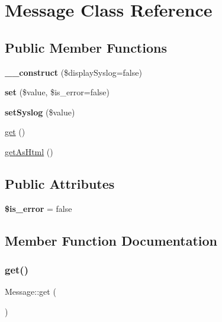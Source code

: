 \hypertarget{classMessage}{}\section{Message Class Reference}
\label{classMessage}
\subsection*{Public Member Functions}
\begin{DoxyCompactItemize}
\item 
\mbox{\label{classMessage_af63a9fa2f7f10cb76bd52a01ce8a8559}} 
{\bfseries \+\_\+\+\_\+construct} (\$display\+Syslog=false)
\item 
\mbox{\label{classMessage_a115ff814c66f0e1f187bd737d8a8722c}} 
{\bfseries set} (\$value, \$is\+\_\+error=false)
\item 
\mbox{\label{classMessage_aca32b4947d0e54e39c22d359f6ae4a33}} 
{\bfseries set\+Syslog} (\$value)
\item 
\hyperlink{classMessage_a895ffe0bb3e37dab6e7f5b53751e4fb7}{get} ()
\item 
\hyperlink{classMessage_a09832b55a8b16c93af3a503f96d1c8d4}{get\+As\+Html} ()
\end{DoxyCompactItemize}
\subsection*{Public Attributes}
\begin{DoxyCompactItemize}
\item 
\mbox{\label{classMessage_a265612c70c7f8fd3e3e7a789528a97eb}} 
{\bfseries \$is\+\_\+error} = false
\end{DoxyCompactItemize}


\subsection{Member Function Documentation}
\mbox{\label{classMessage_a895ffe0bb3e37dab6e7f5b53751e4fb7}} 
\subsubsection{\texorpdfstring{get()}{get()}}
{\footnotesize\ttfamily Message\+::get (\begin{DoxyParamCaption}{ }\end{DoxyParamCaption})}

